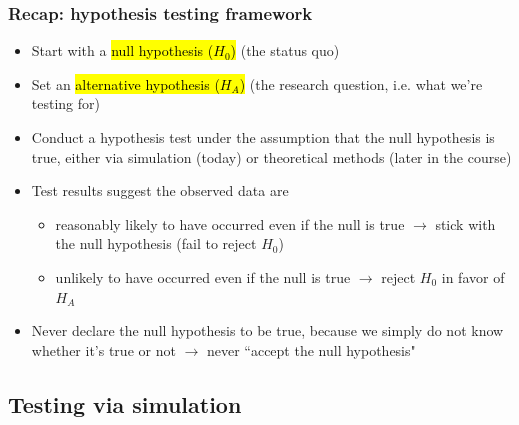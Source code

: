 \documentclass[11pt,containsverbatim,handout,xcolor=xelatex,dvipsnames,table]{beamer}
\begin{document}
\begin{frame}
\frametitle{Recap: hypothesis testing framework}

\begin{itemize}
\item Start with a \hl{null hypothesis ($H_0$)} (the status quo)

\pause

\item Set an \hl{alternative hypothesis ($H_A$)} (the research question, i.e. what we're testing for)

\pause

\item Conduct a hypothesis test under the assumption that the null hypothesis is true, either via simulation (today) or theoretical methods (later in the course)

\pause

\item Test results suggest the observed data are 
\begin{itemize}
\item reasonably likely to have occurred even if the null is true $\rightarrow$ stick with the null hypothesis (fail to reject $H_0$)
\item unlikely to have occurred even if the null is true $\rightarrow$ reject $H_0$ in favor of $H_A$
\end{itemize}

\pause

\item Never declare the null hypothesis to be true, because we simply do not know whether it's true or not $\rightarrow$ never ``accept the null hypothesis"

\end{itemize}

\end{frame}


\subsection{Testing via simulation}

\end{document}
